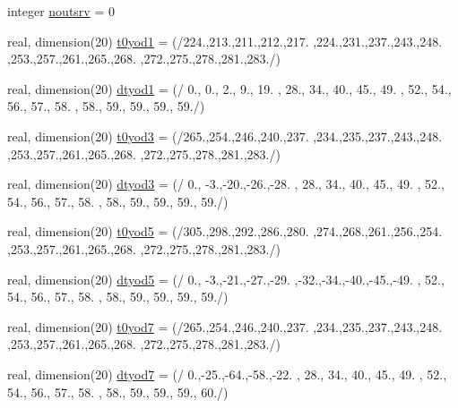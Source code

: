 \begin{DoxyCompactItemize}
\item 
integer \hyperlink{classpumamod_a44281642d8b5de10c4c6309d65787612}{noutsrv} = 0
\item 
real, dimension(20) \hyperlink{classpumamod_a90a6d9081ae4e97368fd93f921dca1d8}{t0yod1} = (/224.,213.,211.,212.,217. ,224.,231.,237.,243.,248. ,253.,257.,261.,265.,268. ,272.,275.,278.,281.,283./)
\item 
real, dimension(20) \hyperlink{classpumamod_a01f849a7ffd4d78c73588a15edbc3527}{dtyod1} = (/ 0., 0., 2., 9., 19. , 28., 34., 40., 45., 49. , 52., 54., 56., 57., 58. , 58., 59., 59., 59., 59./)
\item 
real, dimension(20) \hyperlink{classpumamod_ab716103cdc0613b90aea0b0f3f76890e}{t0yod3} = (/265.,254.,246.,240.,237. ,234.,235.,237.,243.,248. ,253.,257.,261.,265.,268. ,272.,275.,278.,281.,283./)
\item 
real, dimension(20) \hyperlink{classpumamod_a0f35364ab66cbd60fdedebdd3c776eee}{dtyod3} = (/ 0., -\/3.,-\/20.,-\/26.,-\/28. , 28., 34., 40., 45., 49. , 52., 54., 56., 57., 58. , 58., 59., 59., 59., 59./)
\item 
real, dimension(20) \hyperlink{classpumamod_aae0fef74d51d5c0b6ac17c46aee81602}{t0yod5} = (/305.,298.,292.,286.,280. ,274.,268.,261.,256.,254. ,253.,257.,261.,265.,268. ,272.,275.,278.,281.,283./)
\item 
real, dimension(20) \hyperlink{classpumamod_ac054354166003ed7452262a59c8edf70}{dtyod5} = (/ 0., -\/3.,-\/21.,-\/27.,-\/29. ,-\/32.,-\/34.,-\/40.,-\/45.,-\/49. , 52., 54., 56., 57., 58. , 58., 59., 59., 59., 59./)
\item 
real, dimension(20) \hyperlink{classpumamod_ac3109427e5fbc7662c648cc9c556bcee}{t0yod7} = (/265.,254.,246.,240.,237. ,234.,235.,237.,243.,248. ,253.,257.,261.,265.,268. ,272.,275.,278.,281.,283./)
\item 
real, dimension(20) \hyperlink{classpumamod_a062241f749f35c2747f925d690b667ef}{dtyod7} = (/ 0.,-\/25.,-\/64.,-\/58.,-\/22. , 28., 34., 40., 45., 49. , 52., 54., 56., 57., 58. , 58., 59., 59., 59., 60./)

\end{DoxyCompactItemize}
